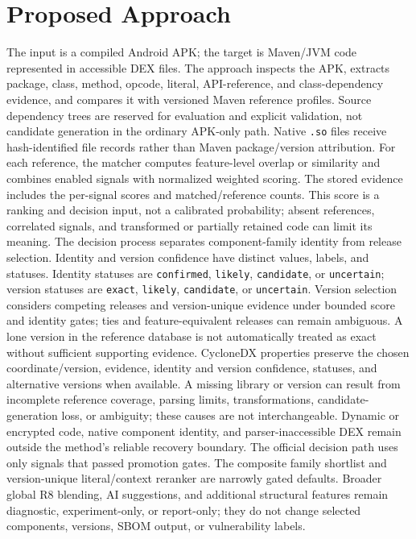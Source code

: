 \documentclass[10pt,twocolumn]{article}
\begin{document}
\section{Proposed Approach}
The input is a compiled Android APK; the target is Maven/JVM code represented in accessible DEX files. The approach inspects the APK, extracts package, class, method, opcode, literal, API-reference, and class-dependency evidence, and compares it with versioned Maven reference profiles. Source dependency trees are reserved for evaluation and explicit validation, not candidate generation in the ordinary APK-only path. Native \texttt{.so} files receive hash-identified file records rather than Maven package/version attribution.
For each reference, the matcher computes feature-level overlap or similarity and combines enabled signals with normalized weighted scoring. The stored evidence includes the per-signal scores and matched/reference counts. This score is a ranking and decision input, not a calibrated probability; absent references, correlated signals, and transformed or partially retained code can limit its meaning.
The decision process separates component-family identity from release selection. Identity and version confidence have distinct values, labels, and statuses. Identity statuses are \texttt{confirmed}, \texttt{likely}, \texttt{candidate}, or \texttt{uncertain}; version statuses are \texttt{exact}, \texttt{likely}, \texttt{candidate}, or \texttt{uncertain}. Version selection considers competing releases and version-unique evidence under bounded score and identity gates; ties and feature-equivalent releases can remain ambiguous. A lone version in the reference database is not automatically treated as exact without sufficient supporting evidence.
CycloneDX properties preserve the chosen coordinate/version, evidence, identity and version confidence, statuses, and alternative versions when available. A missing library or version can result from incomplete reference coverage, parsing limits, transformations, candidate-generation loss, or ambiguity; these causes are not interchangeable. Dynamic or encrypted code, native component identity, and parser-inaccessible DEX remain outside the method's reliable recovery boundary.
The official decision path uses only signals that passed promotion gates. The composite family shortlist and version-unique literal/context reranker are narrowly gated defaults. Broader global R8 blending, AI suggestions, and additional structural features remain diagnostic, experiment-only, or report-only; they do not change selected components, versions, SBOM output, or vulnerability labels.
\end{document}
